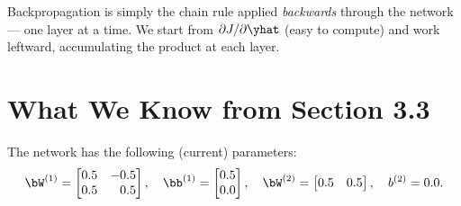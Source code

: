 \documentclass[12pt, a4paper]{article}
\begin{document}
\begin{notebox}
  Backpropagation is simply the chain rule applied \emph{backwards} through
  the network --- one layer at a time.  We start from $\partial J/\partial
    \yhat$ (easy to compute) and work leftward, accumulating the product at
  each layer.
\end{notebox}

\section{What We Know from Section 3.3}
The network has the following (current) parameters:
\[
  \bW^{(1)} = \begin{bmatrix} 0.5 & -0.5 \\ 0.5 & \phantom{-}0.5 \end{bmatrix},
  \quad
  \bb^{(1)} = \begin{bmatrix} 0.5 \\ 0.0 \end{bmatrix},
  \quad
  \bW^{(2)} = \begin{bmatrix} 0.5 & 0.5 \end{bmatrix},
  \quad
  b^{(2)} = 0.0.
\]
\end{document}
